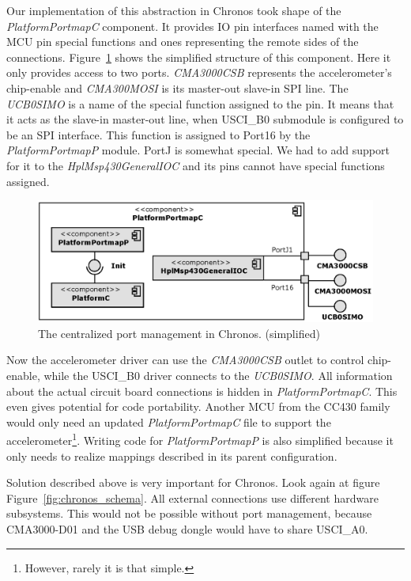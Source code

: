 Our implementation of this abstraction in Chronos took shape of the \emph{PlatformPortmapC} component. It provides IO pin interfaces named with the MCU pin special functions and ones representing the remote sides of the connections. Figure~\ref{fig:platform_portmap_c} shows the simplified structure of this component. Here it only provides access to two ports. \emph{CMA3000CSB} represents the accelerometer's chip-enable and \emph{CMA300MOSI} is its master-out slave-in SPI line. The \emph{UCB0SIMO} is a name of the special function assigned to the pin. It means that it acts as the slave-in master-out line, when USCI\_B0 submodule is configured to be an SPI interface. This function is assigned to Port16 by the \emph{PlatformPortmapP} module. PortJ is somewhat special. We had to add support for it to the  \emph{HplMsp430GeneralIOC} and its pins cannot have special functions assigned.

\begin{figure}[h]
  \centering
  \includegraphics{diagrams/platform_portmap_c.eps}
  \caption{The centralized port management in Chronos. (simplified)}
  \label{fig:platform_portmap_c}
\end{figure}

Now the accelerometer driver can use the \emph{CMA3000CSB} outlet to control chip-enable, while the USCI\_B0 driver connects to the \emph{UCB0SIMO}. All information about the actual circuit board connections is hidden in \emph{PlatformPortmapC}. This even gives potential for code portability. Another MCU from the CC430 family would only need an updated \emph{PlatformPortmapC} file to support the accelerometer\footnote{However, rarely it is that simple.}. Writing code for \emph{PlatformPortmapP} is also simplified because it only needs to realize mappings described in its parent configuration.

Solution described above is very important for Chronos. Look again at figure Figure~\ref{fig:chronos_schema}. All external connections use different hardware subsystems. This would not be possible without port management, because CMA3000-D01 and the USB debug dongle would have to share USCI\_A0.


